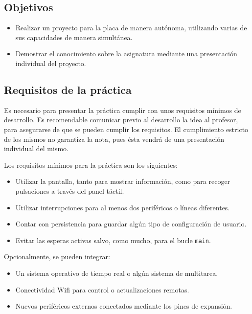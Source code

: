 \documentclass[../main.tex]{subfiles}
\begin{document}

    \subsection{Objetivos}

        \begin{itemize}
            \item Realizar un proyecto para la placa \BOARD de manera autónoma, utilizando varias de sus capacidades de manera simultánea.
            \item Demostrar el conocimiento sobre la asignatura mediante una presentación individual del proyecto.
        \end{itemize}

    \subsection{Requisitos de la práctica}

        Es necesario para presentar la práctica cumplir con unos requisitos mínimos de desarrollo. Es recomendable comunicar previo al desarrollo la idea al profesor, para asegurarse de que se pueden cumplir los requisitos. El cumplimiento estricto de los mismos no garantiza la nota, pues ésta vendrá de una presentación individual del mismo.

        Los requisitos mínimos para la práctica son los siguientes:

        \begin{itemize}
            \item Utilizar la pantalla, tanto para mostrar información, como para recoger pulsaciones a través del panel táctil.
            \item Utilizar interrupciones para al menos dos periféricos o líneas diferentes.
            \item Contar con persistencia para guardar algún tipo de configuración de usuario.
            \item Evitar las esperas activas salvo, como mucho, para el bucle \texttt{main}.
        \end{itemize}

        Opcionalmente, se pueden integrar:

        \begin{itemize}
            \item Un sistema operativo de tiempo real o algún sistema de multitarea.
            \item Conectividad Wifi para control o actualizaciones remotas.
            \item Nuevos periféricos externos conectados mediante los pines de expansión.
        \end{itemize}
\end{document}
